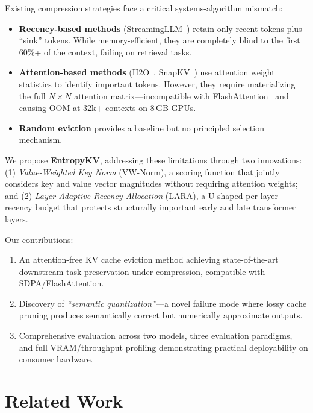 \documentclass{article}
\begin{document}
Existing compression strategies face a critical systems-algorithm mismatch:

\begin{itemize}
    \item \textbf{Recency-based methods} (StreamingLLM~\cite{xiao2023streaming}) retain only recent tokens plus ``sink'' tokens. While memory-efficient, they are completely blind to the first 60\%+ of the context, failing on retrieval tasks.
    \item \textbf{Attention-based methods} (H2O~\cite{zhang2023h2o}, SnapKV~\cite{li2024snapkv}) use attention weight statistics to identify important tokens. However, they require materializing the full $N \times N$ attention matrix---incompatible with FlashAttention~\cite{dao2022flashattention} and causing OOM at 32k+ contexts on 8\,GB GPUs.
    \item \textbf{Random eviction} provides a baseline but no principled selection mechanism.
\end{itemize}

We propose \textbf{EntropyKV}, addressing these limitations through two innovations: (1) \emph{Value-Weighted Key Norm} (VW-Norm), a scoring function that jointly considers key and value vector magnitudes without requiring attention weights; and (2) \emph{Layer-Adaptive Recency Allocation} (LARA), a U-shaped per-layer recency budget that protects structurally important early and late transformer layers.

Our contributions:
\begin{enumerate}
    \item An attention-free KV cache eviction method achieving state-of-the-art downstream task preservation under compression, compatible with SDPA/FlashAttention.
    \item Discovery of \emph{``semantic quantization''}---a novel failure mode where lossy cache pruning produces semantically correct but numerically approximate outputs.
    \item Comprehensive evaluation across two models, three evaluation paradigms, and full VRAM/throughput profiling demonstrating practical deployability on consumer hardware.
\end{enumerate}

\section{Related Work}
\end{document}
